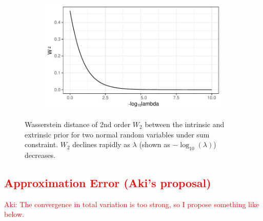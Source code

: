 \documentclass[10pt]{article}
\newcommand{\aki}[1]{\textcolor{red}{Aki: #1}}
\DeclareMathOperator{\1}{\mathbbm{1}}
\begin{document}
\begin{figure}[H]
\centering
   \begin{subfigure}[b]{0.45\textwidth}
    \includegraphics[width=1\textwidth]{two_normal_wass.pdf}
	\end{subfigure}
\caption{Wasserstein distance of 2nd order $W_2$ between the intrinsic and extrinsic prior for two normal random variables under sum constraint. $W_2$ declines rapidly as $\lambda$ (shown as $-\log_{10}(\lambda)$) decreases.}
\label{two_normal_wass}
\end{figure}


\subsection{\textcolor{red}{Approximation Error (Aki's proposal)}}

\aki{The convergence in total variation is too strong, so I propose something like below.}
\newcommand{\tilpi}{\tilde{\pi}}
\end{document}

